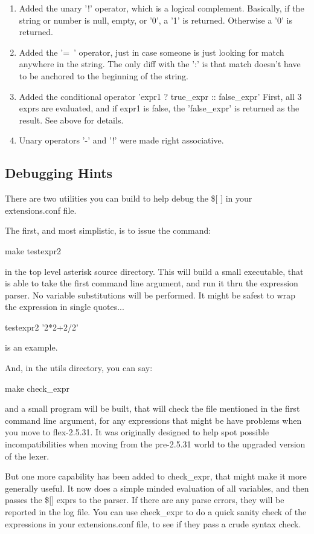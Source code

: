\begin{enumerate}
\item  Added the unary '!' operator, which is a logical complement.
    Basically, if the string or number is null, empty, or '0',
    a '1' is returned. Otherwise a '0' is returned.

\item  Added the '=~' operator, just in case someone is just looking for
    match anywhere in the string. The only diff with the ':' is that
    match doesn't have to be anchored to the beginning of the string.

\item  Added the conditional operator  'expr1 ? true\_expr :: false\_expr'
    First, all 3 exprs are evaluated, and if expr1 is false, the 'false\_expr'
    is returned as the result. See above for details. 

\item  Unary operators '-' and '!' were made right associative.
\end{enumerate}

\subsection{Debugging Hints}

There are two utilities you can build to help debug the \$[ ] in
your extensions.conf file.

The first, and most simplistic, is to issue the command:

make testexpr2

in the top level asterisk source directory. This will build a small
executable, that is able to take the first command line argument, and
run it thru the expression parser. No variable substitutions will be
performed. It might be safest to wrap the expression in single
quotes...

testexpr2 '2*2+2/2'

is an example.

And, in the utils directory, you can say:

make check\_expr

and a small program will be built, that will check the file mentioned
in the first command line argument, for any expressions that might be
have problems when you move to flex-2.5.31.  It was originally
designed to help spot possible incompatibilities when moving from the
pre-2.5.31 world to the upgraded version of the lexer.

But one more capability has been added to check\_expr, that might make
it more generally useful. It now does a simple minded evaluation of
all variables, and then passes the \$[] exprs to the parser. If there
are any parse errors, they will be reported in the log file. You can
use check\_expr to do a quick sanity check of the expressions in your
extensions.conf file, to see if they pass a crude syntax check.

